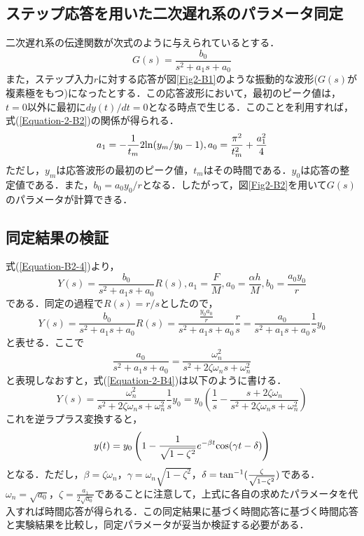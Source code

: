 \documentclass[12pt]{jsarticle}
\begin{document}
\subsection{ステップ応答を用いた二次遅れ系のパラメータ同定}
二次遅れ系の伝達関数が次式のように与えられているとする．
\begin{equation}
  \label{Equation-2-B1}
  G(s) = \frac{b_0}{s^2+a_1s+a_0}
\end{equation}
また，ステップ入力$r$に対する応答が図\ref{Fig2-B1}のような振動的な波形($G(s)$が複素極をもつ)になったとする．この応答波形において，最初のピーク値は，$t=0$以外に最初に$dy(t)/dt = 0$となる時点で生じる．このことを利用すれば，式(\ref{Equation-2-B2})の関係が得られる．
\begin{equation}
  \label{Equation-2-B2}
  a_1 = -\frac{1}{t_m}2{\rm ln}(y_m/y_0 -1),  a_0 = \frac{\pi^2}{t_m^2}+\frac{a_1^2}{4}
\end{equation}
ただし，$y_m$は応答波形の最初のピーク値，$t_m$はその時間である．$y_0$は応答の整定値である．また，$b_0=a_0y_0/r$となる．したがって，図\ref{Fig2-B2}を用いて$G(s)$のパラメータが計算できる．
\subsection{同定結果の検証}
式(\ref{Equation-B2-4})より，
\begin{equation}
  \label{Equation-2-B3}
  Y(s) = \frac{b_0}{s^2+a_1 s + a_0}R(s),    a_1=\frac{F}{M}, a_0=\frac{\alpha h}{M}, b_0=\frac{a_0 y_0}{r}
\end{equation}
である．同定の過程で$R(s)=r/s$としたので，
\begin{equation}
  \label{Equation-2-B4}
  Y(s) = \frac{b_0}{s^2+a_1 s + a_0} R(s) = \frac{\frac{y_0 a_0}{r}}{s^2+a_1s+a_0}\frac{r}{s} = \frac{a_0}{s^2+a_1s+a_0}\frac{1}{s}y_0
\end{equation}
と表せる．ここで
\begin{equation}
  \label{Equation-2-B5}
  \frac{a_0}{s^2+a_1s+a_0} = \frac{\omega_n^2}{s^2+2\zeta \omega_ns + \omega_n^2}
\end{equation}
と表現しなおすと，式(\ref{Equation-2-B4})は以下のように書ける．
\begin{equation}
  \label{Equation-2-B6}
  Y(s) = \frac{\omega_n^2}{s^2+2\zeta \omega_n s + \omega_n^2}\frac{1}{s}y_0 = y_0(\frac{1}{s} - \frac{s+2\zeta \omega_n}{s^2 + 2\zeta \omega_n s + \omega_n^2})
\end{equation}
これを逆ラプラス変換すると，
\begin{equation}
  \label{Equation-2-B7}
  y(t) = y_0 \left(1 - \frac{1}{\sqrt{1-\zeta^2}}e^{-\beta t} {\rm cos}(\gamma t - \delta)\right)
\end{equation}
となる．ただし，$\beta=\zeta \omega_n$，$\gamma =\omega_n \sqrt{1-\zeta^2}$，$\delta={\rm tan}^{-1}(\frac{\zeta}{\sqrt{1-\zeta^2}})$である．$\omega_n=\sqrt{a_0}$，$\zeta=\frac{a_1}{2\sqrt{a_0}}$であることに注意して，上式に各自の求めたパラメータを代入すれば時間応答が得られる．この同定結果に基づく時間応答に基づく時間応答と実験結果を比較し，同定パラメータが妥当か検証する必要がある．
\end{document}
